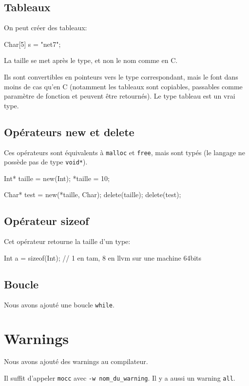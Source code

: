 \documentclass{scrartcl}
\newcommand{\mocc}{\texttt{mocc}}
\begin{document}
  \subsection{Tableaux}\label{tab}
    On peut créer des tableaux:
    \begin{moccode}
Char[5] s = "net7";
    \end{moccode}

    La taille se met après le type, et non le nom comme en C.

    Ils sont convertibles en pointeurs vers le type correspondant, mais le font
    dans moins de cas qu'en C (notamment les tableaux sont copiables,
    passables comme paramètre de fonction et peuvent être retournés). Le type
    tableau est un vrai type.

  \subsection{Opérateurs new et delete}\label{new}
    Ces opérateurs sont équivalents à \verb+malloc+ et \verb+free+, mais sont
    typés (le langage ne possède pas de type \verb+void*+).

    \begin{moccode}
Int* taille = new(Int);
*taille = 10;

Char* test = new(*taille, Char);
delete(taille);
delete(test);
    \end{moccode}

  \subsection{Opérateur sizeof}
    Cet opérateur retourne la taille d'un type:

    \begin{moccode}
Int a = sizeof(Int); // 1 en tam, 8 en llvm sur une machine 64bits
    \end{moccode}

  \subsection{Boucle}
    Nous avons ajouté une boucle \verb+while+.

\section{Warnings}
  Nous avons ajouté des warnings au compilateur.

  Il suffit d'appeler \mocc{} avec \verb+-w nom_du_warning+.
  Il y a aussi un warning \verb+all+.
\end{document}
